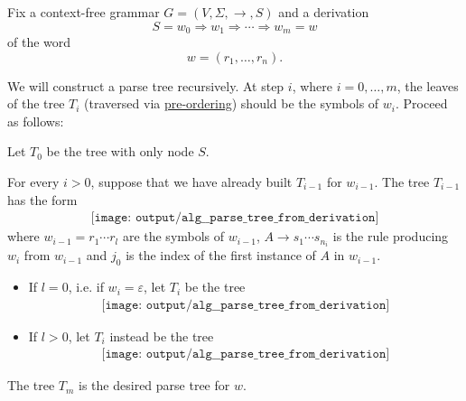 \begin{algorithm}\label{alg:derivation_to_parse_tree}
  Fix a context-free grammar \( G = (V, \Sigma, \to, S) \) and a derivation
  \begin{equation*}
    S = w_0 \Rightarrow w_1 \Rightarrow \cdots \Rightarrow w_m = w
  \end{equation*}
  of the word
  \begin{equation*}
    w = (r_1, \ldots, r_n).
  \end{equation*}

  We will construct a parse tree recursively. At step \( i \), where \( i = 0, \ldots, m \), the leaves of the tree \( T_i \) (traversed via \hyperref[def:traversal_ordering]{pre-ordering}) should be the symbols of \( w_i \). Proceed as follows:
  \begin{thmenum}
     Let \( T_0 \) be the tree with only node \( S \).

     For every \( i > 0 \), suppose that we have already built \( T_{i-1} \) for \( w_{i-1} \). The tree \( T_{i-1} \) has the form
    \begin{equation*}
      \begin{aligned}
        \texttt{[image: output/alg\_\_parse\_tree\_from\_derivation]}
      \end{aligned}
    \end{equation*}
    where \( w_{i-1} = r_1 \cdots r_l \) are the symbols of \( w_{i-1} \), \( A \to s_1 \cdots s_{n_i} \) is the rule producing \( w_i \) from \( w_{i-1} \) and \( j_0 \) is the index of the first instance of \( A \) in \( w_{i-1} \).

    \begin{itemize}
      \item If \( l = 0 \), i.e. if \( w_i = \varepsilon \), let \( T_i \) be the tree
      \begin{equation*}
        \begin{aligned}
          \texttt{[image: output/alg\_\_parse\_tree\_from\_derivation]}
        \end{aligned}
      \end{equation*}

      \item If \( l > 0 \), let \( T_i \) instead be the tree
      \begin{equation*}
        \begin{aligned}
          \texttt{[image: output/alg\_\_parse\_tree\_from\_derivation]}
        \end{aligned}
      \end{equation*}
    \end{itemize}
  \end{thmenum}

   The tree \( T_m \) is the desired parse tree for \( w \).
\end{algorithm}
